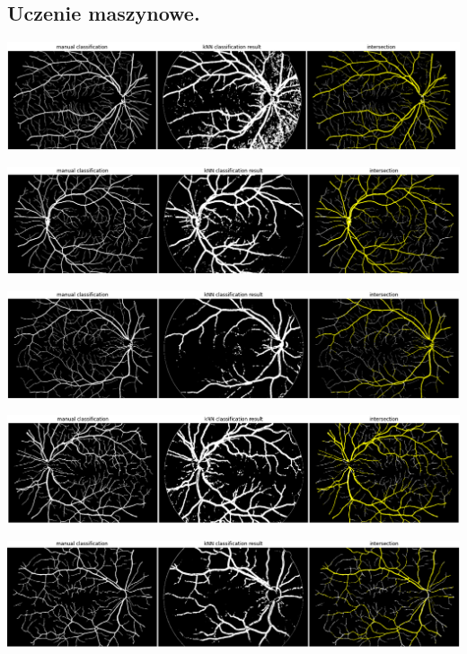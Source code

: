\documentclass[a4paper, 11pt]{article}
\begin{document}
\subsection{Uczenie maszynowe.}

\begin{center}
	\includegraphics[width=\textwidth]{./ML/01_h.png}
	
	\includegraphics[width=\textwidth]{./ML/04_h.png}
	
	\includegraphics[width=\textwidth]{./ML/09_h.png}
	
	\includegraphics[width=\textwidth]{./ML/12_h.png}
	
	\includegraphics[width=\textwidth]{./ML/15_h.png}
	
\end{center}

\newpage
\end{document}
